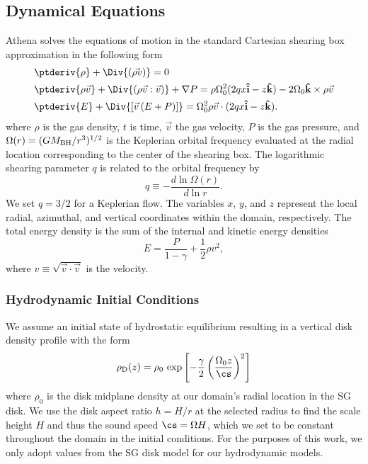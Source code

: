 \subsection{Dynamical Equations} \label{sec:dyn-eq}
Athena solves the equations of motion in the standard Cartesian shearing box approximation in the following form
\begin{align}
    &\ptderiv{\rho} + \Div{\left(\rho\vec{}{v}\right)} = 0
    \label{eqn:cons_mass} \\
    &\ptderiv{\rho \vec{v}} + \Div{\left(\rho \vec{v} : \vec{v}\right)} + \nabla P =
    \rho \Omega_{0}^{2}(2qx{\bf \hat{i}} - z{\bf \hat{k}}) - 2\Omega_{0} {\bf \hat{k}} \times \rho \vec{v}
    \label{eqn:cons_momentum} \\
    &\ptderiv{E} + \Div{\left[\vec{v}\left(E + P\right)\right]} =
    \Omega_{0}^{2}\rho\vec{v} \cdot (2qx{\bf \hat{i}} - z{\bf \hat{k}}).
    \label{eqn:cons_energy}
\end{align}
where $\rho$ is the gas density, $t$ is time, $\vec{v}$ the gas velocity, $P$ is the gas pressure, and $\Omega(r) = (GM_{\rm BH}/r^3)^{1/2}$ is the Keplerian orbital frequency evaluated at the radial location corresponding to the center of the shearing box.
The logarithmic shearing parameter $q$ is related to the orbital frequency by
\begin{equation}
    q \equiv -\frac{d\ln\Omega(r)}{d\ln r}.
\end{equation}
We set $q=3/2$ for a Keplerian flow.
The variables $x$, $y$, and $z$ represent the local radial, azimuthal, and vertical coordinates within the domain, respectively.
The total energy density is the sum of the internal and kinetic energy densities
\begin{equation}
    E = \frac{P}{1-\gamma} + \frac{1}{2}\rho v^2,
\end{equation}
where $v \equiv \sqrt{ \vec{v} \cdot \vec{v} }$ is the velocity.


\subsubsection{Hydrodynamic Initial Conditions} \label{sec:ICs}

 \label{sec:disk-model}

We assume an initial state of hydrostatic equilibrium resulting in a vertical disk density profile with the form
\begin{equation} \label{eqn:disk-z-profile}
    \rho_{\rm D} (z) = \rho_0 \, \exp\left[-\frac{\gamma}{2} \left(\frac{\Omega_0 z}{\cs}\right)^2 \right]
\end{equation}
where $\rho_0$ is the disk midplane density at our domain's radial location in the SG disk. We use the disk aspect ratio $h=H/r$ at the selected radius to find the scale height $H$ and thus the sound speed $\cs=\Omega H$, which we set to be constant throughout the domain in the initial conditions.
For the purposes of this work, we only adopt values from the SG disk model for our hydrodynamic models.


